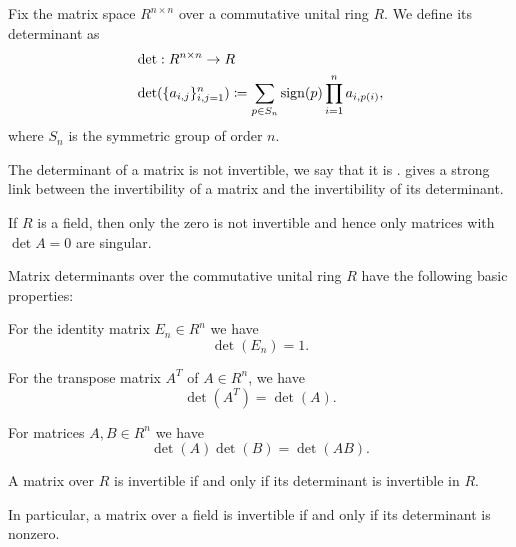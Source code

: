 \begin{definition}\label{def:matrix_determinant}\cite[215]{Knapp2016BAlg}
  Fix the matrix space \( R^{n \times n} \) over a commutative unital ring \( R \). We define its determinant as
  \begin{align*}
    &\det: R^{n \times n} \to R \\
    &\det(\{ a_{i,j} \}_{i,j=1}^n) \coloneqq \sum_{p \in S_n} \operatorname{sign}(p) \prod_{i=1}^n a_{i,p(i)},
  \end{align*}
  where \( S_n \) is the symmetric group of order \( n \).

  The determinant of a matrix is not invertible, we say that it is .  gives a strong link between the invertibility of a matrix and the invertibility of its determinant.

  If \( R \) is a field, then only the zero is not invertible and hence only matrices with \( \det A = 0 \) are singular.
\end{definition}

\begin{proposition}\label{def:matrix_determinant_properties}\cite[proposition 5.1]{Knapp2016BAlg}
  Matrix determinants over the commutative unital ring \( R \) have the following basic properties:
  \begin{propenum}
     For the identity matrix \( E_n \in R^n \) we have
    \begin{equation*}
      \det(E_n) = 1.
    \end{equation*}

     For the transpose matrix \( A^T \) of \( A \in R^n \), we have
    \begin{equation*}
      \det(A^T) = \det(A).
    \end{equation*}

     For matrices \( A, B \in R^n \) we have
    \begin{equation*}
      \det(A) \det(B) = \det(AB).
    \end{equation*}
  \end{propenum}
\end{proposition}

\begin{proposition}\label{thm:matrix_invertible_iff_nonsingular}\cite[corollary 5.5]{Knapp2016BAlg}
  A matrix over \( R \) is invertible if and only if its determinant is invertible in \( R \).

  In particular, a matrix over a field is invertible if and only if its determinant is nonzero.
\end{proposition}

